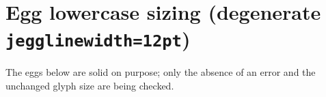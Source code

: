 \documentclass{jlreq}
\begin{document}
\section*{Egg lowercase sizing (degenerate \texttt{jegglinewidth=12pt})}

\KKSeggbasesuite

\noindent The eggs below are solid on purpose; only the absence of an error
and the unchanged glyph size are being checked.\par
{}
\end{document}
